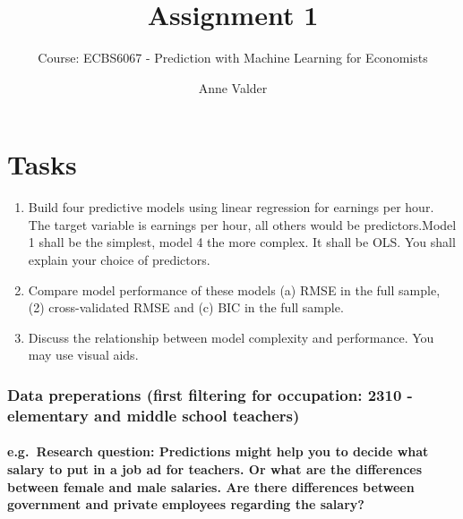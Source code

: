 \documentclass[
]{article}
\title{Assignment 1}
\subtitle{Course: ECBS6067 - Prediction with Machine Learning for
Economists}
\author{Anne Valder}
\date{}
\begin{document}
\maketitle

\hypertarget{tasks}{%
\section{Tasks}\label{tasks}}

\begin{enumerate}
\def\labelenumi{\arabic{enumi}.}
\item
  Build four predictive models using linear regression for earnings per
  hour. The target variable is earnings per hour, all others would be
  predictors.Model 1 shall be the simplest, model 4 the more complex. It
  shall be OLS. You shall explain your choice of predictors.
\item
  Compare model performance of these models (a) RMSE in the full sample,
  (2) cross-validated RMSE and (c) BIC in the full sample.
\item
  Discuss the relationship between model complexity and performance. You
  may use visual aids.
\end{enumerate}

\hypertarget{data-preperations-first-filtering-for-occupation-2310---elementary-and-middle-school-teachers}{%
\subsubsection{Data preperations (first filtering for occupation: 2310 -
elementary and middle school
teachers)}\label{data-preperations-first-filtering-for-occupation-2310---elementary-and-middle-school-teachers}}

\hypertarget{e.g.-research-question-predictions-might-help-you-to-decide-what-salary-to-put-in-a-job-ad-for-teachers.-or-what-are-the-differences-between-female-and-male-salaries.-are-there-differences-between-government-and-private-employees-regarding-the-salary}{%
\paragraph{e.g.~Research question: Predictions might help you to decide
what salary to put in a job ad for teachers. Or what are the differences
between female and male salaries. Are there differences between
government and private employees regarding the
salary?}\label{e.g.-research-question-predictions-might-help-you-to-decide-what-salary-to-put-in-a-job-ad-for-teachers.-or-what-are-the-differences-between-female-and-male-salaries.-are-there-differences-between-government-and-private-employees-regarding-the-salary}}
\end{document}
